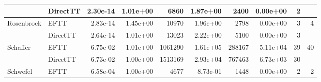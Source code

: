 \begin{table}[!ht]
{\begin{tabular}{llrrrrrrrr}
                                   & DirectTT                        & 2.30e-14                    & 1.01e+00                                           & 6860                           & 1.87e+00                                            & 2400                          & 0.00e+00                                         & 2                                        &                                          \\ \hline
    \multirow{2}{*}{Rosenbrock}    & EFTT                            & 2.83e-14                    & 1.45e+00                                           & 10970                          & 1.96e+00                                            & 2798                          & 0.00e+00                                         & 3                                        & 4                                        \\ %
                                   & DirectTT                        & 2.64e-14                    & 1.01e+00                                           & 13023                          & 2.22e+00                                            & 5100                          & 0.00e+00                                         & 3                                        &                                          \\ \hline
    \multirow{2}{*}{Schaffer}      & EFTT                            & 6.75e-02                    & 1.01e+00                                           & 1061290                        & 1.61e+05                                            & 288167                        & 5.11e+04                                         & 39                                       & 40                                       \\ %
                                   & DirectTT                        & 6.73e-02                    & 1.00e+00                                           & 1513169                        & 2.93e+04                                            & 767463                        & 6.73e+03                                         & 30                                       &                                          \\ \hline
    \multirow{2}{*}{Schwefel}      & EFTT                            & 6.58e-04                    & 1.00e+00                                           & 4677                           & 8.73e-01                                            & 1448                          & 0.00e+00                                         & 2                                        & 2                                        \\ %

\end{tabular}}
\end{table}
